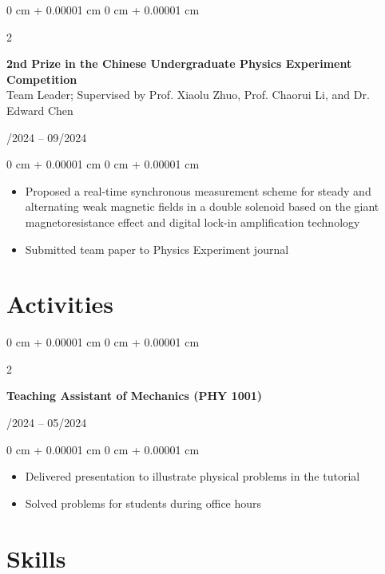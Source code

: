\documentclass[10pt, letterpaper]{article}
\newenvironment{highlights}{
    \begin{itemize}[
        topsep=0.10 cm,
        parsep=0.10 cm,
        partopsep=0pt,
        itemsep=0pt,
        leftmargin=0 cm + 10pt
    ]
}{
    \end{itemize}
} %
\newenvironment{onecolentry}{
    \begin{adjustwidth}{
        0 cm + 0.00001 cm
    }{
        0 cm + 0.00001 cm
    }
}{
    \end{adjustwidth}
} %
\newenvironment{twocolentry}[2][]{
    \onecolentry
    \def\secondColumn{#2}
    \setcolumnwidth{\fill, 4.5 cm}
    \begin{paracol}{2}
}{
    \switchcolumn \raggedleft \secondColumn
    \end{paracol}
    \endonecolentry
} %
\begin{document}
        \vspace{0.2 cm}

        \begin{twocolentry}{
            07/2024 -- 09/2024
        }
            \textbf{2nd Prize in the Chinese Undergraduate Physics Experiment Competition}\\
            Team Leader; Supervised by Prof. Xiaolu Zhuo, Prof. Chaorui Li, and Dr. Edward Chen
        \end{twocolentry}

        \vspace{0.10 cm}
        \begin{onecolentry}
            \begin{highlights}
                \item Proposed a real-time synchronous measurement scheme for steady and alternating weak magnetic fields in a double solenoid based on the giant magnetoresistance effect and digital lock-in amplification technology
                \item Submitted team paper to Physics Experiment journal
            \end{highlights}
        \end{onecolentry}

    \section{Activities}

        \begin{twocolentry}{
            01/2024 -- 05/2024
        }
            \textbf{Teaching Assistant of Mechanics (PHY 1001)}
        \end{twocolentry}

        \vspace{0.10 cm}
        \begin{onecolentry}
            \begin{highlights}
                \item Delivered presentation to illustrate physical problems in the tutorial
                \item Solved problems for students during office hours
            \end{highlights}
        \end{onecolentry}

    \section{Skills}
\end{document}
